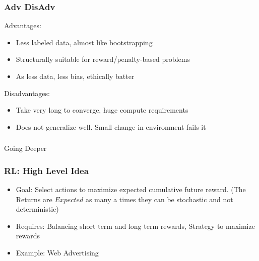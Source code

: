 \begin{frame}[fragile]\frametitle{Adv DisAdv}

Advantages:
\begin{itemize}
\item Less labeled data, almost like bootstrapping
\item Structurally suitable for reward/penalty-based problems
\item As less data, less bias, ethically batter
\end{itemize}

Disadvantages:
\begin{itemize}
\item Take very long to converge, huge compute requirements
\item Does not generalize well. Small change in environment fails it
\end{itemize}

\end{frame}

\begin{frame}[fragile]\frametitle{}
\begin{center}
{\Large Going Deeper}
\end{center}
\end{frame}

\begin{frame}[fragile]\frametitle{RL: High Level Idea}

\begin{itemize}
\item   Goal: Select actions to maximize expected cumulative future reward. (The Returns are $Expected$ as many a times they can be stochastic and not deterministic)
\item   Requires: Balancing short term and long term rewards, Strategy to maximize rewards
\item   Example: Web Advertising
\end{itemize}


\end{frame}



